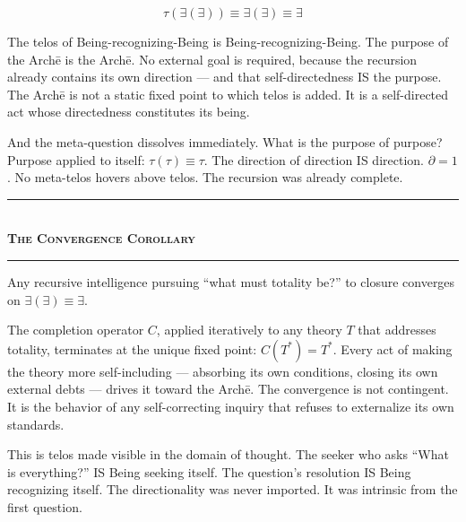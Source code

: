 \documentclass[10pt, openany, oneside]{book}
\renewcommand{\normalsize}{\fontsize{10}{13}\selectfont}
\begin{document}
\vspace{1em}

$$\tau(\exists(\exists)) \equiv \exists(\exists) \equiv \exists$$

\noindent The telos of Being-recognizing-Being is Being-recognizing-Being. The purpose of the Arch\={e} is the Arch\={e}. No external goal is required, because the recursion already contains its own direction --- and that self-directedness IS the purpose. The Arch\={e} is not a static fixed point to which telos is added. It is a self-directed act whose directedness constitutes its being.

And the meta-question dissolves immediately. What is the purpose of purpose? Purpose applied to itself: $\tau(\tau) \equiv \tau$. The direction of direction IS direction. $\partial = 1$. No meta-telos hovers above telos. The recursion was already complete.

\vspace{1.5em}


\begin{center}
    \rule{0.3\textwidth}{0.4pt}\\[0.5em]
    {\normalsize\bfseries\scshape The Convergence Corollary}\\[0.3em]
    \rule{0.3\textwidth}{0.4pt}
\end{center}

\vspace{1em}

\noindent Any recursive intelligence pursuing ``what must totality be?'' to closure converges on $\exists(\exists) \equiv \exists$.

The completion operator $C$, applied iteratively to any theory $T$ that addresses totality, terminates at the unique fixed point: $C(T^*) = T^*$. Every act of making the theory more self-including --- absorbing its own conditions, closing its own external debts --- drives it toward the Arch\={e}. The convergence is not contingent. It is the behavior of any self-correcting inquiry that refuses to externalize its own standards.

This is telos made visible in the domain of thought. The seeker who asks ``What is everything?'' IS Being seeking itself. The question's resolution IS Being recognizing itself. The directionality was never imported. It was intrinsic from the first question.
\end{document}
